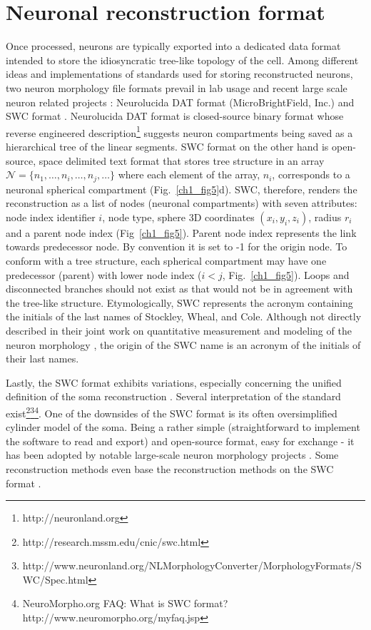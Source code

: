 \section{Neuronal reconstruction format}
\label{ch1_sec4}
Once processed, neurons are typically exported into a dedicated data format intended to store the idiosyncratic tree-like topology of the cell. Among different ideas and implementations of standards used for storing reconstructed neurons, two neuron morphology file formats prevail in lab usage and recent large scale neuron related projects \cite{bakker2016web}: Neurolucida DAT format (MicroBrightField, Inc.) and SWC format \cite{cannon1998line}. Neurolucida DAT format is closed-source binary format whose reverse engineered description\footnote{http://neuronland.org} suggests neuron compartments being saved as a hierarchical tree of the linear segments. SWC format on the other hand is open-source, space delimited text format that stores tree structure in an array $\mathcal{N} = \{ n_1, \dots , n_i, \dots , n_j, \dots  \}$ where each element of the array, $n_i$, corresponds to a neuronal spherical compartment (Fig.~\ref{ch1_fig5}d). SWC, therefore, renders the reconstruction as a list of nodes (neuronal compartments) with seven attributes: node index identifier $i$, node type, sphere 3D coordinates $(x_i,y_i,z_i)$, radius $r_i$ and a parent node index (Fig~\ref{ch1_fig5}). Parent node index represents the link towards predecessor node. By convention it is set to -1 for the origin node. To conform with a tree structure, each spherical compartment may have one predecessor (parent) with lower node index ($i<j$, Fig.~\ref{ch1_fig5}). Loops and disconnected branches should not exist as that would not be in agreement with the tree-like structure. Etymologically, SWC represents the acronym containing the initials of the last names of Stockley, Wheal, and Cole. Although not directly described in their joint work on quantitative measurement and modeling of the neuron morphology \cite{stockley1993system}, the origin of the SWC name is an acronym of the initials of their last names. 

Lastly, the SWC format exhibits variations, especially concerning the unified definition of the soma reconstruction \cite{bakker2016web}. Several interpretation of the standard exist\footnote{http://research.mssm.edu/cnic/swc.html}\footnote{http://www.neuronland.org/NLMorphologyConverter/MorphologyFormats/SWC/Spec.html}\footnote{NeuroMorpho.org FAQ: What is SWC format? http://www.neuromorpho.org/myfaq.jsp}. One of the downsides of the SWC format is its often oversimplified cylinder model of the soma. Being a rather simple (straightforward to implement the software to read and export) and open-source format, easy for exchange - it has been adopted by notable large-scale neuron morphology projects \cite{ascoli2007neuromorpho,peng2015bigneuron}. Some reconstruction methods even base the reconstruction methods on the SWC format \cite{feng2015neutube}.

